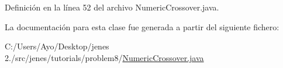 Definición en la línea 52 del archivo Numeric\-Crossover.\-java.



La documentación para esta clase fue generada a partir del siguiente fichero\-:\begin{DoxyCompactItemize}
\item 
C\-:/\-Users/\-Ayo/\-Desktop/jenes 2./src/jenes/tutorials/problem8/\hyperlink{_numeric_crossover_8java}{Numeric\-Crossover.\-java}\end{DoxyCompactItemize}
